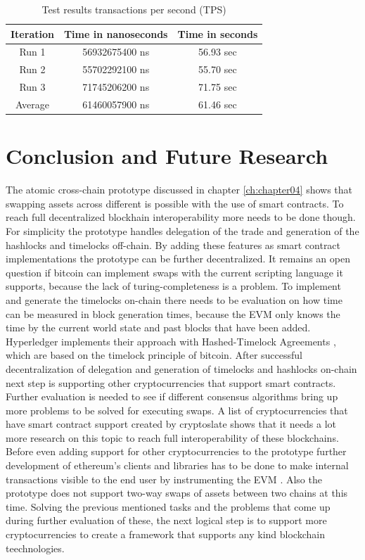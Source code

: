 \begin{table}[h!]
	\centering
	\begin{tabular}{|c | c | c |} 
		\hline 
		Iteration & Time in nanoseconds & Time in seconds \\ [0.5ex] 
		\hline \hline
		Run 1 & 56932675400 ns & 56.93 sec  \\ 
		\hline
		Run 2 & 55702292100 ns & 55.70 sec  \\
		\hline
		Run 3 & 71745206200 ns & 71.75 sec  \\
		\hline
		Average & 61460057900 ns & 61.46 sec  \\ [1ex] 
		\hline
	\end{tabular}
	\caption{Test results transactions per second (TPS)}
	\label{table:4}
\end{table}

\chapter{Conclusion and Future Research}
\label{ch:chapter05}
The atomic cross-chain prototype discussed in chapter \ref{ch:chapter04} shows that swapping assets across different is possible with the use of smart contracts. To reach full decentralized blockhain interoperability more needs to be done though. For simplicity the prototype handles delegation of the trade and generation of the hashlocks and timelocks off-chain. By adding these features as smart contract implementations the prototype can be further decentralized. It remains an open question if bitcoin can implement swaps with the current scripting language it supports, because the lack of turing-completeness is a problem. To implement and generate the timelocks on-chain there needs to be evaluation on how time can be measured in block generation times, because the \ac{EVM} only knows the time by the current world state and past blocks that have been added. Hyperledger implements their approach with Hashed-Timelock Agreements \cite{HTLAs}, which are based on the timelock \cite{timelock} principle of bitcoin. After successful decentralization of delegation and generation of timelocks and hashlocks on-chain next step is supporting other cryptocurrencies that support smart contracts. Further evaluation is needed to see if different consensus algorithms bring up more problems to be solved for executing swaps. A list of cryptocurrencies that have smart contract support created by cryptoslate \cite{smart_contract_coins} shows that it needs a lot more research on this topic to reach full interoperability of these blockchains. Before even adding support for other cryptocurrencies to the prototype further development of ethereum's clients and libraries has to be done to make internal transactions visible to the end user by instrumenting the EVM \cite{instrumenting_evm}. Also the prototype does not support two-way swaps of assets between two chains at this time. Solving the previous mentioned tasks and the problems that come up during further evaluation of these, the next logical step is to support more cryptocurrencies to create a framework that supports any kind blockchain teechnologies.

